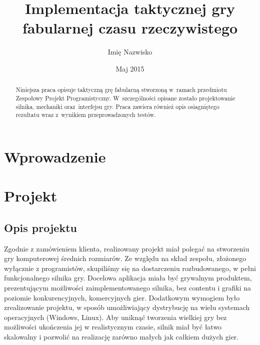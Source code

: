 \documentclass[licencjacka]{pracamgr}
\author	{Imię Nazwisko}
\title{Implementacja taktycznej gry fabularnej czasu rzeczywistego}
\date{Maj 2015}
\begin{document}
\maketitle

\begin{abstract}
  Niniejsza praca opisuje taktyczną grę fabularną stworzoną
  w~ramach przedmiotu Zespołowy Projekt Programistyczny.
  W~szczególności opisane zostało projektowanie silnika,
  mechaniki oraz~interfejsu gry. Praca zawiera również 
  opis osiagniętego rezultatu wraz z~wynikiem przeprowadzonych testów.
\end{abstract}

\tableofcontents

\chapter*{Wprowadzenie}

\chapter{Projekt}

  \section{Opis projektu}
  Zgodnie z zamówieniem klienta, realizowany projekt miał polegać na stworzeniu gry komputerowej
  średnich rozmiarów. Ze względu na skład zespołu, złożonego wyłącznie z programistów, skupiliśmy się 
  na dostarczeniu rozbudowanego, w pełni funkcjonalnego silnika gry.
  Docelowa aplikacja miała być grywalnym produktem, prezentującym możliwości zaimplementowanego silnika,
  bez contentu i grafiki na poziomie konkurencyjnych, komercyjnych gier. Dodatkowym wymogiem było zrealizowanie
  projektu, w sposób umożliwiający dystrybucję na wielu systemach operacyjnych (Windows, Linux). Aby uniknąć 
  tworzenia wielkiej gry bez możliwości ukończenia jej w realistycznym czasie, silnik miał być łatwo skalowalny 
  i pozwolić na realizację zarówno małych jak całkiem dużych gier.
\end{document}
